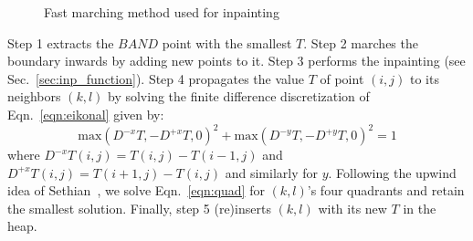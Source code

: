 \documentclass{llncs}
\begin{document}
	\begin{figure}[h] \centering
	\caption{Fast marching method used for inpainting}
	\label{fig:fmm_code} 
        \end{figure} 
%
%
Step 1 extracts the $BAND$ point with the smallest $T$. Step 2 marches
the boundary inwards by adding new points to it. Step 3 performs the
inpainting (see Sec.~\ref{sec:inp_function}). Step 4 propagates the value
$T$ of point $(i,j)$ to its neighbors $(k,l)$ by solving the finite difference discretization of
Eqn.~\ref{eqn:eikonal} given by:
%
\begin{equation}
  \mbox{max}(D^{-x}T,-D^{+x}T,0)^2+\mbox{max}(D^{-y}T,-D^{+y}T,0)^2 = 1
\label{eqn:quad}
\end{equation}
%
where $D^{-x}T(i,j) = T(i,j)-T(i-1,j)$ and $D^{+x}T(i,j) = T(i+1,j)-T(i,j)$
and similarly for $y$. Following the upwind idea of Sethian~\cite{sethian},
we solve Eqn.~\ref{eqn:quad} for $(k,l)$'s four quadrants and retain
the smallest solution. Finally, step 5 (re)inserts $(k,l)$
with its new $T$ in the heap.

%
%
\end{document}

